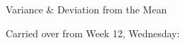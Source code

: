 \documentclass[handout]{mcs}
\begin{document}

\begin{staffnotes}
Variance \& Deviation from the Mean
\end{staffnotes}


Carried over from Week 12, Wednesday:

\end{document}
